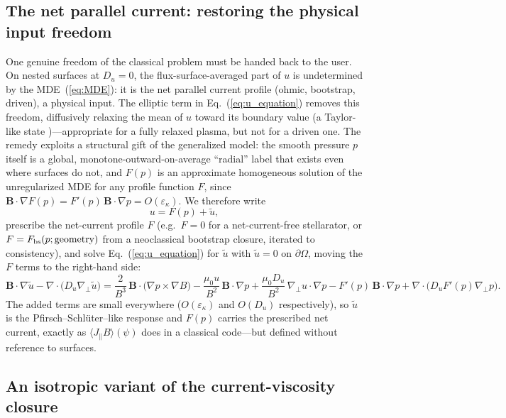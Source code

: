 \documentclass[english]{article}
\newcommand{\bB}{\mathbf{B}}
\newcommand{\gradperp}{\nabla_{\!\perp}}
\begin{document}
\subsection{The net parallel current: restoring the physical input freedom}
\label{sec:net_current}

One genuine freedom of the classical problem must be handed back to the user. On nested surfaces at
$D_u=0$, the flux-surface-averaged part of $u$ is undetermined by the MDE~(\ref{eq:MDE}): it is the
net parallel current profile (ohmic, bootstrap, driven), a physical input. The elliptic term in
Eq.~(\ref{eq:u_equation}) removes this freedom, diffusively relaxing the mean of $u$ toward its
boundary value (a Taylor-like state \cite{boozer1986})---appropriate for a fully relaxed plasma,
but not for a driven one. The remedy exploits a structural gift of the generalized model: the
smooth pressure $p$ itself is a global, monotone-outward-on-average ``radial'' label that exists
even where surfaces do not, and $F(p)$ is an approximate homogeneous solution of the unregularized
MDE for any profile function $F$, since $\bB\cdot\nabla F(p)=F'(p)\,\bB\cdot\nabla
p=O(\varepsilon_\kappa)$. We therefore write
\begin{equation}
u=F(p)+\tilde u ,
\label{eq:u_split}
\end{equation}
prescribe the net-current profile $F$ (e.g.\ $F=0$ for a net-current-free stellarator, or
$F=F_{\rm bs}(p;\text{geometry})$ from a neoclassical bootstrap closure, iterated to consistency),
and solve Eq.~(\ref{eq:u_equation}) for $\tilde u$ with $\tilde u=0$ on $\partial\Omega$, moving
the $F$ terms to the right-hand side:
\begin{equation}
\bB\cdot\nabla\tilde u-\nabla\cdot\big(D_u\gradperp\tilde u\big)
=\frac{2}{B^{3}}\,\bB\cdot\big(\nabla p\times\nabla B\big)
-\frac{\mu_0 u}{B^{2}}\,\bB\cdot\nabla p
+\frac{\mu_0 D_u}{B^{2}}\,\gradperp u\cdot\nabla p
-F'(p)\,\bB\cdot\nabla p
+\nabla\cdot\big(D_u F'(p)\gradperp p\big) .
\label{eq:utilde_equation}
\end{equation}
The added terms are small everywhere ($O(\varepsilon_\kappa)$ and $O(D_u)$ respectively), so
$\tilde u$ is the Pfirsch--Schl\"uter--like response and $F(p)$ carries the prescribed net current,
exactly as $\langle J_\parallel B\rangle(\psi)$ does in a classical code---but defined without
reference to surfaces.

\subsection{An isotropic variant of the current-viscosity closure}
\label{sec:isotropic_variant}
\end{document}
